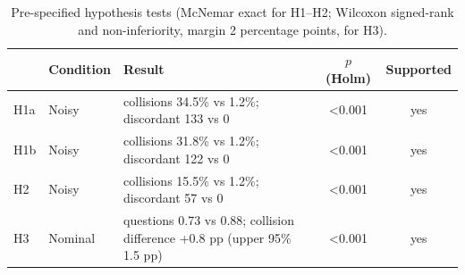 \begin{table}[t]
\centering
\caption{Pre-specified hypothesis tests (McNemar exact for H1--H2; Wilcoxon signed-rank and non-inferiority, margin 2 percentage points, for H3).}
\label{tab:hypotheses}
\begin{tabular}{llp{8cm}cc}
\toprule
 & Condition & Result & $p$ (Holm) & Supported \\
\midrule
H1a & Noisy & collisions 34.5\% vs 1.2\%; discordant 133 vs 0 & <0.001 & yes \\
H1b & Noisy & collisions 31.8\% vs 1.2\%; discordant 122 vs 0 & <0.001 & yes \\
H2 & Noisy & collisions 15.5\% vs 1.2\%; discordant 57 vs 0 & <0.001 & yes \\
H3 & Nominal & questions 0.73 vs 0.88; collision difference +0.8 pp (upper 95\% 1.5 pp) & <0.001 & yes \\
\bottomrule
\end{tabular}
\end{table}
